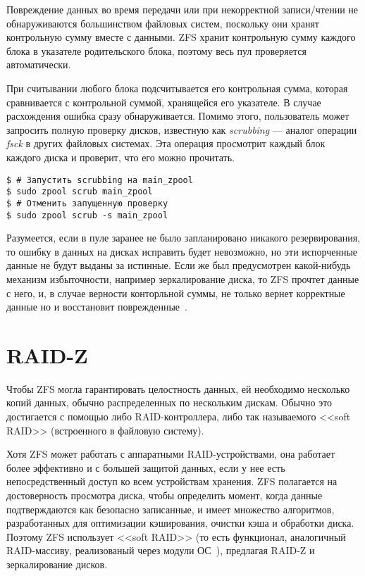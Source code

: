 \documentclass[a4page]{article}
\begin{document}
Повреждение данных во время передачи или при некорректной записи/чтении
не обнаруживаются большинством файловых систем, поскольку они хранят контрольную сумму вместе с данными.
ZFS хранит контрольную сумму каждого блока в указателе родительского блока,
поэтому весь пул проверяется автоматически.

При считывании любого блока подсчитывается его контрольная сумма,
которая сравнивается с контрольной суммой, хранящейся его указателе.
В случае расхождения ошибка сразу обнаруживается.
Помимо этого, пользователь может запросить полную проверку дисков,
известную как \emph{scrubbing} --- аналог операции \emph{fsck} в других файловых системах.
Эта операция просмотрит каждый блок каждого диска и проверит, что его можно прочитать.

\begin{verbatim}
$ # Запустить scrubbing на main_zpool
$ sudo zpool scrub main_zpool
$ # Отменить запущенную проверку
$ sudo zpool scrub -s main_zpool
\end{verbatim}

Разумеется, если в пуле заранее не было запланировано никакого резервирования, то ошибку в данных на дисках исправить будет невозможно, но эти испорченные данные не будут выданы за истинные.
Если же был предусмотрен какой-нибудь механизм избыточности, например зеркалирование диска,
то ZFS прочтет данные с него, и, в случае верности конторльной суммы,
не только вернет корректные данные но и восстановит поврежденные~\cite{youtube}.

\section{RAID-Z}

Чтобы ZFS могла гарантировать целостность данных, ей необходимо несколько копий данных,
обычно распределенных по нескольким дискам.
Обычно это достигается с помощью либо RAID-контроллера,
либо так называемого <<soft RAID>> (встроенного в файловую систему).

Хотя ZFS может работать с аппаратными RAID-устройствами,
она работает более эффективно и с большей защитой данных,
если у нее есть непосредственный доступ ко всем устройствам хранения.
ZFS полагается на достоверность просмотра диска, чтобы определить момент,
когда данные подтверждаются как безопасно записанные, и имеет множество алгоритмов,
разработанных для оптимизации кэширования, очистки кэша и обработки диска.
Поэтому ZFS использует <<soft RAID>> (то есть функционал, аналогичный RAID-массиву,
реализованый через модули ОС~\cite{wiki:raid}), предлагая RAID-Z и зеркалирование дисков.
\end{document}
